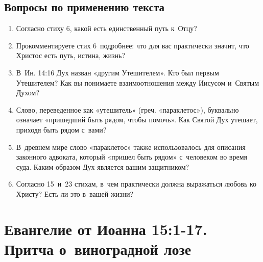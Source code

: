 \documentclass[a4paper,12pt]{article}
\begin{document}
\subsection*{Вопросы по применению текста} 
\begin{enumerate}
    \item Согласно стиху 6, какой есть единственный путь к~Отцу? 
    
    \myline
    
    \myline
    \item Прокомментируете стих 6~подробнее: что для вас практически значит, что Христос есть путь, истина, жизнь? 
    
    \myline
    
    \myline
    \item В~Ин. 14:16 Дух назван «другим Утешителем». Кто был первым Утешителем? Как вы понимаете взаимоотношения между Иисусом и~Святым Духом? 
    
    \myline
    
    \myline
    \item Слово, переведенное как «утешитель» (греч. «параклетос»), буквально означает «пришедший быть рядом, чтобы помочь». Как Святой Дух утешает, приходя быть рядом с~вами? 
    
    \myline
    
    \myline
    \item В~древнем мире слово «параклетос» также использовалось для описания законного адвоката, который «пришел быть рядом» с~человеком во время суда. Каким образом Дух является вашим защитником? 
    
    \myline
    
    \myline
    \item Согласно 15~и~23 стихам, в~чем практически должна выражаться любовь ко Христу? Есть ли это в~вашей жизни?
    
    \myline
    
    \myline
\end{enumerate}



\section{Евангелие от Иоанна 15:1-17. Притча о~виноградной лозе}
\end{document}
